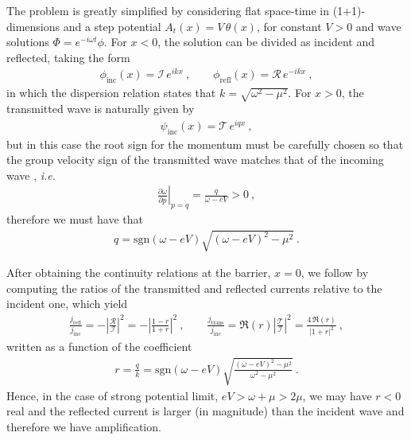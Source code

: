 The problem is greatly simplified by considering flat space-time in (1+1)-dimensions and a step potential $A_t(x) = V\,\theta(x)$, for constant $V>0$ and wave solutions $\Phi= e^{-i \omega t} \phi$.
For $x<0$, the solution can be divided as incident and reflected, taking the form
\begin{align}
    \phi_\mathrm{inc}(x) = \mathscr{I}\, e^{i k x}  ~, \qquad
    \phi_\mathrm{refl}(x) = \mathscr{R}\, e^{- i k x} ~,
    \label{eq1:KGsolneg}
\end{align}
in which the dispersion relation states that $k=\sqrt{\omega^2-\mu^2}$. For $x>0$, the transmitted wave is naturally given by 
\begin{align}
    \psi_\mathrm{inc}(x) = \mathscr{T}\, e^{i q x}  ~,
    \label{eq1:KGsolpos}
\end{align}
but in this case the root sign for the momentum must be carefully chosen so that the group velocity sign of the transmitted wave matches that of the incoming wave \cite{Manogue1988}, \textit{i.e.}
\begin{align}
    \left.\frac{\partial \omega}{\partial p}\right|_{p=q} = \frac{q}{\omega - e V} > 0 ~,
    \label{eq1:KGphasev}
\end{align}
therefore we must have that
\begin{align}
    q = \mathrm{sgn}(\omega - e V) \sqrt{ (\omega - e V)^2 - \mu^2 } ~.
    \label{eq1:KGq}
\end{align}

After obtaining the continuity relations at the barrier, $x=0$, we follow by computing the ratios of the transmitted and reflected currents relative to the incident one, which yield
\begin{align}
    \frac{j_\mathrm{refl}}{j_\mathrm{inc}} = - \left|\frac{\mathscr{R}}{\mathscr{I}}\right|^2 = -\left|\frac{1-r}{1+r}\right|^2  ~, \qquad \frac{j_\mathrm{trans}}{j_\mathrm{inc}} = \Re(r) \left|\frac{\mathscr{T}}{\mathscr{I}}\right|^2 = \frac{4\, \Re(r)}{|1+r|^2} ~,
    \label{eq1:KGcurrents}
\end{align}
written as a function of the coefficient 
\begin{align}
    r = \frac{q}{k} = \mathrm{sgn}(\omega - e V)  \sqrt{\frac{(\omega - e V)^2 - \mu^2}{\omega^2 - \mu^2}} ~.
    \label{eq1:KGr}
\end{align}
Hence, in the case of strong potential limit, $e V > \omega + \mu > 2 \mu$, we may have $r<0$ real and the reflected current is larger (in magnitude) than the incident wave and therefore we have amplification.

